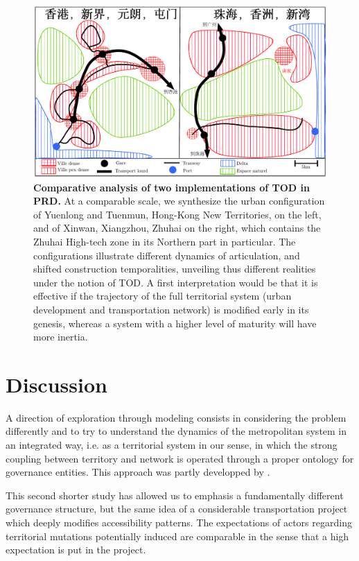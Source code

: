 \begin{figure}
	\includegraphics[width=\linewidth]{figures/1-3-1-fig-qualitative-schema.pdf}
	\caption{\textbf{Comparative analysis of two implementations of TOD in PRD.} At a comparable scale, we synthesize the urban configuration of Yuenlong and Tuenmun, Hong-Kong New Territories, on the left, and of Xinwan, Xiangzhou, Zhuhai on the right, which contains the Zhuhai High-tech zone in its Northern part in particular. The configurations illustrate different dynamics of articulation, and shifted construction temporalities, unveiling thus different realities under the notion of TOD. A first interpretation would be that it is effective if the trajectory of the full territorial system (urban development and transportation network) is modified early in its genesis, whereas a system with a higher level of maturity will have more inertia.\label{fig:qualitative:schema}}
\end{figure}





\section{Discussion}


A direction of exploration through modeling consists in considering the problem differently and to try to understand the dynamics of the metropolitan system in an integrated way, i.e. as a territorial system in our sense, in which the strong coupling between territory and network is operated through a proper ontology for governance entities. This approach was partly developped by .

This second shorter study has allowed us to emphasis a fundamentally different governance structure, but the same idea of a considerable transportation project which deeply modifies accessibility patterns. The expectations of actors regarding territorial mutations potentially induced are comparable in the sense that a high expectation is put in the project.

